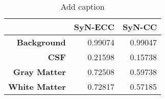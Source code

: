 \begin{table}[htbp]
  \centering
  \caption{Add caption}
    \begin{tabular}{|r|r|r|}
    \toprule
    \textbf{} & \textbf{SyN-ECC} & \textbf{SyN-CC} \\
    \midrule
    \textbf{Background} & 0.99074 & 0.99047 \\
    \textbf{CSF} & 0.21598 & 0.15738 \\
    \textbf{Gray Matter} & 0.72508 & 0.59738 \\
    \textbf{White Matter} & 0.72817 & 0.57185 \\
    \bottomrule
    \end{tabular}%
  \label{tab:addlabel}%
\end{table}%
